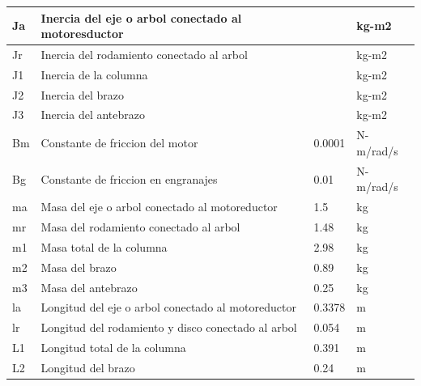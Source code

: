 \documentclass[conference]{IEEEtran}
\begin{document}
\begin{table}
\begin{tabular}{|l|l|l|l|}
\hline
Ja                                        & Inercia del eje o arbol conectado al motoresductor &        & kg-m2      \\ 
\hline
Jr                                        & Inercia del rodamiento conectado al arbol          &        & kg-m2      \\ 
\hline
J1                                        & Inercia de la columna                              &        & kg-m2      \\ 
\hline
J2                                        & Inercia del brazo                                  &        & kg-m2      \\ 
\hline
J3                                        & Inercia del antebrazo                              &        & kg-m2      \\ 
\hline
Bm                                        & Constante de friccion del motor                    & 0.0001    & N-m/rad/s  \\ 
\hline
Bg                                        & Constante de friccion en engranajes                & 0.01      & N-m/rad/s  \\ 
\hline
ma                                        & Masa del eje o arbol conectado al motoreductor     & 1.5       & kg         \\ 
\hline
mr                                        & Masa del rodamiento conectado al arbol             & 1.48      & kg         \\ 
\hline
m1                                        & Masa total de la columna                           & 2.98      & kg         \\ 
\hline
m2                                        & Masa del brazo                                     & 0.89      & kg         \\ 
\hline
m3                                        & Masa del antebrazo                                 & 0.25      & kg         \\ 
\hline
la                                        & Longitud del eje o arbol conectado al motoreductor & 0.3378    & m          \\ 
\hline
lr                                        & Longitud del rodamiento y disco conectado al arbol & 0.054     & m          \\ 
\hline
L1                                        & Longitud total de la columna                       & 0.391     & m          \\ 
\hline
L2                                        & Longitud del brazo                                 & 0.24      & m          \\ 

\end{tabular}
\end{table}
\end{document}
